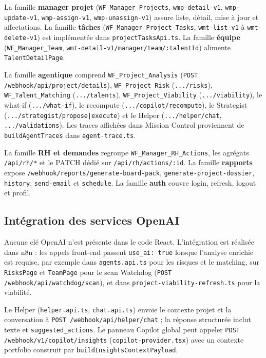 La famille \textbf{manager projet} (\texttt{WF\_Manager\_Projects}, \texttt{wmp-detail-v1}, \texttt{wmp-update-v1}, \texttt{wmp-assign-v1}, \texttt{wmp-unassign-v1}) assure liste, détail, mise à jour et affectations. La famille \textbf{tâches} (\texttt{WF\_Manager\_Project\_Tasks}, \texttt{wmt-list-v1} à \texttt{wmt-delete-v1}) est implémentée dans \texttt{projectTasksApi.ts}. La famille \textbf{équipe} (\texttt{WF\_Manager\_Team}, \texttt{wmt-detail-v1/manager/team/:talentId}) alimente \texttt{TalentDetailPage}.

La famille \textbf{agentique} comprend \texttt{WF\_Project\_Analysis} (\texttt{POST /webhook/api/project/details}), \texttt{WF\_Project\_Risk} (\texttt{.../risks}), \texttt{WF\_Talent\_Matching} (\texttt{.../talents}), \texttt{WF\_Project\_Viability} (\texttt{.../viability}), le what-if (\texttt{.../what-if}), le recompute (\texttt{.../copilot/recompute}), le Strategist (\texttt{.../strategist/propose|execute}) et le Helper (\texttt{.../helper/chat}, \texttt{.../validations}). Les traces affichées dans Mission Control proviennent de \texttt{buildAgentTraces} dans \texttt{agent-trace.ts}.

La famille \textbf{RH et demandes} regroupe \texttt{WF\_Manager\_RH\_Actions}, les agrégats \texttt{/api/rh/*} et le PATCH dédié sur \texttt{/api/rh/actions/:id}. La famille \textbf{rapports} expose \texttt{/webhook/reports/generate-board-pack}, \texttt{generate-project-dossier}, \texttt{history}, \texttt{send-email} et \texttt{schedule}. La famille \textbf{auth} couvre login, refresh, logout et profil.

\subsection{Intégration des services OpenAI}

Aucune clé OpenAI n'est présente dans le code React. L'intégration est réalisée dans n8n : les appels front-end passent \texttt{use\_ai: true} lorsque l'analyse enrichie est requise, par exemple dans \texttt{agents.api.ts} pour les risques et le matching, sur \texttt{RisksPage} et \texttt{TeamPage} pour le scan Watchdog (\texttt{POST /webhook/api/watchdog/scan}), et dans \texttt{project-viability-refresh.ts} pour la viabilité.

Le Helper (\texttt{helper.api.ts}, \texttt{chat.api.ts}) envoie le contexte projet et la conversation à \texttt{POST /webhook/api/helper/chat} ; la réponse structurée inclut texte et \texttt{suggested\_actions}. Le panneau Copilot global peut appeler \texttt{POST /webhook/v1/copilot/insights} (\texttt{copilot-provider.tsx}) avec un contexte portfolio construit par \texttt{buildInsightsContextPayload}.


